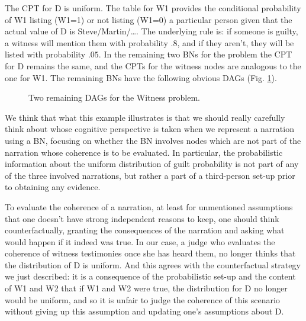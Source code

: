 \documentclass[10pt,]{scrartcl}
\begin{document}
The CPT for \textsf{D} is uniform. The table for \textsf{W1} provides
the conditional probability of \textsf{W1} listing (\textsf{W1}=1) or
not listing (\textsf{W1}=0) a particular person given that the actual
value of \textsf{D} is Steve/Martin/\dots. The underlying rule is: if
someone is guilty, a witness will mention them with probability \(.8\),
and if they aren't, they will be listed with probability \(.05\). In the
remaining two BNs for the problem the CPT for \textsf{D} remains the
same, and the CPTs for the witness nodes are analogous to the one for
\textsf{W1}. The remaining BNs have the following obvious DAGs (Fig.
\ref{fig:witness}).

\begin{figure}\centering
{}

\caption{Two remaining DAGs for the \textsf{Witness} problem.}
\label{fig:witness}
\end{figure}

\newpage

We think that what this example illustrates is that we should really
carefully think about whose cognitive perspective is taken when we
represent a narration using a BN, focusing on whether the BN involves
nodes which are not part of the narration whose coherence is to be
evaluated. In particular, the probabilistic information about the
uniform distribution of guilt probability is not part of any of the
three involved narrations, but rather a part of a third-person set-up
prior to obtaining any evidence.

To evaluate the coherence of a narration, at least for unmentioned
assumptions that one doesn't have strong independent reasons to keep,
one should think counterfactually, granting the consequences of the
narration and asking what would happen if it indeed was true. In our
case, a judge who evaluates the coherence of witness testimonies once
she has heard them, no longer thinks that the distribution of \textsf{D}
is uniform. And this agrees with the counterfactual strategy we just
described: it is a consequence of the probabilistic set-up and the
content of \textsf{W1} and \textsf{W2} that if \textsf{W1} and
\textsf{W2} were true, the distribution for \textsf{D} no longer would
be uniform, and so it is unfair to judge the coherence of this scenario
without giving up this assumption and updating one's assumptions about
\textsf{D}.
\end{document}
